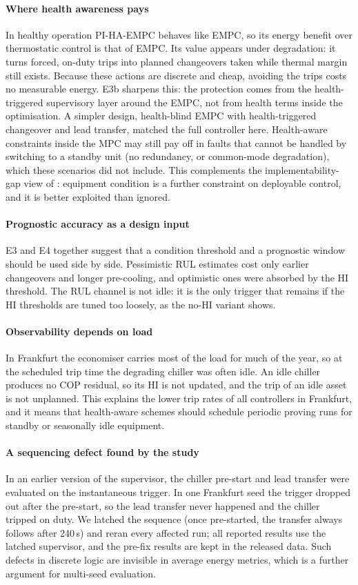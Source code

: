 \documentclass[preprint,12pt,authoryear]{elsarticle}
\begin{document}
\paragraph{Where health awareness pays} In healthy operation PI-HA-EMPC behaves like EMPC, so its energy benefit over thermostatic control is that of EMPC. Its value appears under degradation: it turns forced, on-duty trips into planned changeovers taken while thermal margin still exists. Because these actions are discrete and cheap, avoiding the trips costs no measurable energy. E3b sharpens this: the protection comes from the health-triggered supervisory layer around the EMPC, not from health terms inside the optimisation. A simpler design, health-blind EMPC with health-triggered changeover and lead transfer, matched the full controller here. Health-aware constraints inside the MPC may still pay off in faults that cannot be handled by switching to a standby unit (no redundancy, or common-mode degradation), which these scenarios did not include. This complements the implementability-gap view of \citet{Jadhav2026DT}: equipment condition is a further constraint on deployable control, and it is better exploited than ignored.
\paragraph{Prognostic accuracy as a design input} E3 and E4 together suggest that a condition threshold and a prognostic window should be used side by side. Pessimistic RUL estimates cost only earlier changeovers and longer pre-cooling, and optimistic ones were absorbed by the HI threshold. The RUL channel is not idle: it is the only trigger that remains if the HI thresholds are tuned too loosely, as the no-HI variant shows.
\paragraph{Observability depends on load} In Frankfurt the economiser carries most of the load for much of the year, so at the scheduled trip time the degrading chiller was often idle. An idle chiller produces no COP residual, so its HI is not updated, and the trip of an idle asset is not unplanned. This explains the lower trip rates of all controllers in Frankfurt, and it means that health-aware schemes should schedule periodic proving runs for standby or seasonally idle equipment.
\paragraph{A sequencing defect found by the study} In an earlier version of the supervisor, the chiller pre-start and lead transfer were evaluated on the instantaneous trigger. In one Frankfurt seed the trigger dropped out after the pre-start, so the lead transfer never happened and the chiller tripped on duty. We latched the sequence (once pre-started, the transfer always follows after 240\,s) and reran every affected run; all reported results use the latched supervisor, and the pre-fix results are kept in the released data. Such defects in discrete logic are invisible in average energy metrics, which is a further argument for multi-seed evaluation.
\end{document}

